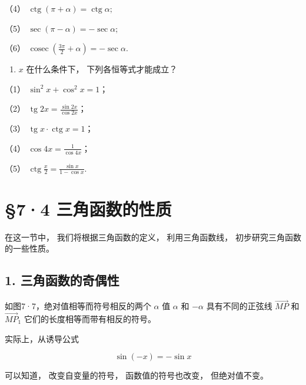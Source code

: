 （4） \(\operatorname{ctg}(\pi + \alpha) = \operatorname{ctg}\alpha;\)

（5） \(\sec (\pi -\alpha) = -\sec \alpha ;\)

（6）
\(\operatorname{cosec}\left(\frac{3\pi}{2}+\alpha\right)=-\sec\alpha.\)

\begin{enumerate}[start=3]
\item
  \(x\) 在什么条件下， 下列各恒等式才能成立？
\end{enumerate}

（1） \(\sin^2 x + \cos^2 x = 1\)；

（2） \(\operatorname{tg} 2x = \frac{\sin 2x}{\cos 2x}\)；

（3） \(\operatorname{tg} x \cdot \operatorname{ctg} x = 1\)；

（4） \(\cos 4x = \frac{1}{\cos 4x}\)；

（5） \(\operatorname{ctg} \frac{x}{2} = \frac{\sin x}{1 - \cos x}\).

\section{§7·4 三角函数的性质}

在这一节中， 我们将根据三角函数的定义， 利用三角函数线，
初步研究三角函数的一些性质。

\subsection{1. 三角函数的奇偶性}

如图7·7，绝对值相等而符号相反的两个 \(\alpha\) 值 \(\alpha\) 和
\(-\alpha\) 具有不同的正弦线 \(\overrightarrow{MP}\) 和
\(\overrightarrow{MP}_1\) 它们的长度相等而带有相反的符号。

实际上，从诱导公式

\[
\sin (- x) = - \sin x
\]

可以知道， 改变自变量的符号， 函数值的符号也改变， 但绝对值不变。

